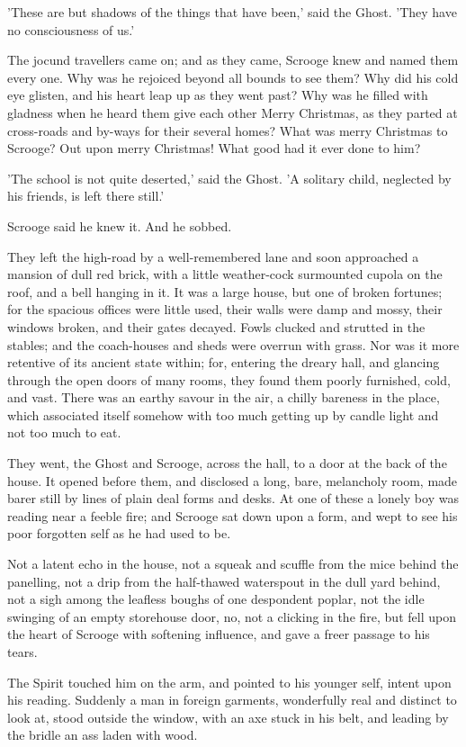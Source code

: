'These are but shadows of the things that have been,' said the Ghost.
'They have no consciousness of us.'

The jocund travellers came on; and as they came, Scrooge knew and named
them every one. Why was he rejoiced beyond all bounds to see them? Why
did his cold eye glisten, and his heart leap up as they went past? Why
was he filled with gladness when he heard them give each other Merry
Christmas, as they parted at cross-roads and by-ways for their several
homes? What was merry Christmas to Scrooge? Out upon merry Christmas!
What good had it ever done to him?

'The school is not quite deserted,' said the Ghost. 'A solitary child,
neglected by his friends, is left there still.'

Scrooge said he knew it. And he sobbed.

They left the high-road by a well-remembered lane and soon approached a
mansion of dull red brick, with a little weather-cock surmounted cupola
on the roof, and a bell hanging in it. It was a large house, but one of
broken fortunes; for the spacious offices were little used, their walls
were damp and mossy, their windows broken, and their gates decayed.
Fowls clucked and strutted in the stables; and the coach-houses and
sheds were overrun with grass. Nor was it more retentive of its ancient
state within; for, entering the dreary hall, and glancing through the
open doors of many rooms, they found them poorly furnished, cold, and
vast. There was an earthy savour in the air, a chilly bareness in the
place, which associated itself somehow with too much getting up by
candle light and not too much to eat.

They went, the Ghost and Scrooge, across the hall, to a door at the back
of the house. It opened before them, and disclosed a long, bare,
melancholy room, made barer still by lines of plain deal forms and
desks. At one of these a lonely boy was reading near a feeble fire; and
Scrooge sat down upon a form, and wept to see his poor forgotten self as
he had used to be.

Not a latent echo in the house, not a squeak and scuffle from the mice
behind the panelling, not a drip from the half-thawed waterspout in the
dull yard behind, not a sigh among the leafless boughs of one despondent
poplar, not the idle swinging of an empty storehouse door, no, not a
clicking in the fire, but fell upon the heart of Scrooge with softening
influence, and gave a freer passage to his tears.

The Spirit touched him on the arm, and pointed to his younger self,
intent upon his reading. Suddenly a man in foreign garments, wonderfully
real and distinct to look at, stood outside the window, with an axe
stuck in his belt, and leading by the bridle an ass laden with wood.

